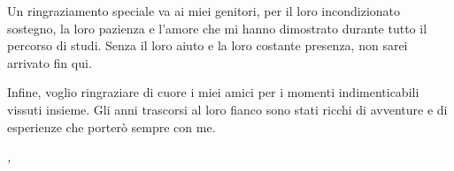 \noindent Un ringraziamento speciale va ai miei genitori, per il loro incondizionato sostegno, la loro pazienza e l'amore che mi hanno dimostrato durante tutto il percorso di studi. Senza il loro aiuto e la loro costante presenza, non sarei arrivato fin qui.

\noindent Infine, voglio ringraziare di cuore i miei amici per i momenti indimenticabili vissuti insieme. Gli anni trascorsi al loro fianco sono stati ricchi di avventure e di esperienze che porterò sempre con me.
\bigskip

\noindent\textit{\myLocation, \myTime}
\hfill \myName

\endgroup
